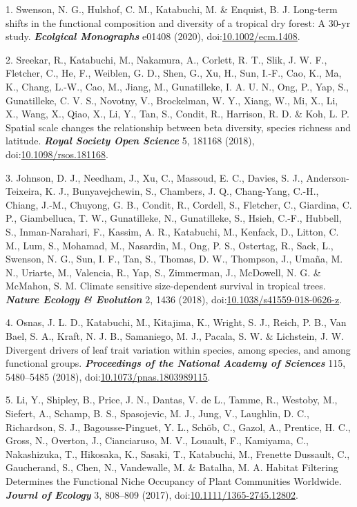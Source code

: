 \documentclass[
]{article}
\newenvironment{cslreferences}%
  {}%
  {\par}
\begin{document}
\hypertarget{refs}{}
\begin{cslreferences}
\leavevmode\hypertarget{ref-Swenson2020}{}%
1. Swenson, N. G., Hulshof, C. M., Katabuchi, M. \& Enquist, B. J.
Long-term shifts in the functional composition and diversity of a
tropical dry forest: A 30-yr study. \emph{\textbf{Ecolgical Monographs}}
e01408 (2020),
doi:\href{https://doi.org/10.1002/ecm.1408}{10.1002/ecm.1408}.

\leavevmode\hypertarget{ref-Sreekar2018}{}%
2. Sreekar, R., Katabuchi, M., Nakamura, A., Corlett, R. T., Slik, J. W.
F., Fletcher, C., He, F., Weiblen, G. D., Shen, G., Xu, H., Sun, I.-F.,
Cao, K., Ma, K., Chang, L.-W., Cao, M., Jiang, M., Gunatilleke, I. A. U.
N., Ong, P., Yap, S., Gunatilleke, C. V. S., Novotny, V., Brockelman, W.
Y., Xiang, W., Mi, X., Li, X., Wang, X., Qiao, X., Li, Y., Tan, S.,
Condit, R., Harrison, R. D. \& Koh, L. P. Spatial scale changes the
relationship between beta diversity, species richness and latitude.
\emph{\textbf{Royal Society Open Science}} 5, 181168 (2018),
doi:\href{https://doi.org/10.1098/rsos.181168}{10.1098/rsos.181168}.

\leavevmode\hypertarget{ref-Johnson2018}{}%
3. Johnson, D. J., Needham, J., Xu, C., Massoud, E. C., Davies, S. J.,
Anderson-Teixeira, K. J., Bunyavejchewin, S., Chambers, J. Q.,
Chang-Yang, C.-H., Chiang, J.-M., Chuyong, G. B., Condit, R., Cordell,
S., Fletcher, C., Giardina, C. P., Giambelluca, T. W., Gunatilleke, N.,
Gunatilleke, S., Hsieh, C.-F., Hubbell, S., Inman-Narahari, F., Kassim,
A. R., Katabuchi, M., Kenfack, D., Litton, C. M., Lum, S., Mohamad, M.,
Nasardin, M., Ong, P. S., Ostertag, R., Sack, L., Swenson, N. G., Sun,
I. F., Tan, S., Thomas, D. W., Thompson, J., Umaña, M. N., Uriarte, M.,
Valencia, R., Yap, S., Zimmerman, J., McDowell, N. G. \& McMahon, S. M.
Climate sensitive size-dependent survival in tropical trees.
\emph{\textbf{Nature Ecology \& Evolution}} 2, 1436 (2018),
doi:\href{https://doi.org/10.1038/s41559-018-0626-z}{10.1038/s41559-018-0626-z}.

\leavevmode\hypertarget{ref-Osnas2018}{}%
4. Osnas, J. L. D., Katabuchi, M., Kitajima, K., Wright, S. J., Reich,
P. B., Van Bael, S. A., Kraft, N. J. B., Samaniego, M. J., Pacala, S. W.
\& Lichstein, J. W. Divergent drivers of leaf trait variation within
species, among species, and among functional groups.
\emph{\textbf{Proceedings of the National Academy of Sciences}} 115,
5480--5485 (2018),
doi:\href{https://doi.org/10.1073/pnas.1803989115}{10.1073/pnas.1803989115}.

\leavevmode\hypertarget{ref-Li2017}{}%
5. Li, Y., Shipley, B., Price, J. N., Dantas, V. de L., Tamme, R.,
Westoby, M., Siefert, A., Schamp, B. S., Spasojevic, M. J., Jung, V.,
Laughlin, D. C., Richardson, S. J., Bagousse-Pinguet, Y. L., Schöb, C.,
Gazol, A., Prentice, H. C., Gross, N., Overton, J., Cianciaruso, M. V.,
Louault, F., Kamiyama, C., Nakashizuka, T., Hikosaka, K., Sasaki, T.,
Katabuchi, M., Frenette Dussault, C., Gaucherand, S., Chen, N.,
Vandewalle, M. \& Batalha, M. A. Habitat Filtering Determines the
Functional Niche Occupancy of Plant Communities Worldwide.
\emph{\textbf{Journl of Ecology}} 3, 808--809 (2017),
doi:\href{https://doi.org/10.1111/1365-2745.12802}{10.1111/1365-2745.12802}.


\end{cslreferences}
\end{document}
